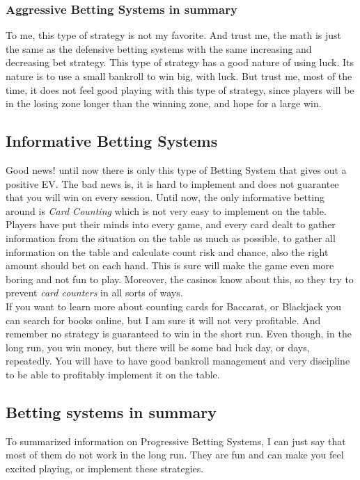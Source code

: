 \documentclass{article}
\begin{document}
\subsubsection{Aggressive Betting Systems in summary}
To me, this type of strategy is not my favorite.  And trust me, the math is just the same as the defensive betting systems with the same increasing and decreasing bet strategy. This type of strategy has a good nature of using luck.  Its nature is to use a small bankroll to win big, with luck.  But trust me, most of the time, it does not feel good playing with this type of strategy, since players will be in the losing zone longer than the winning zone, and hope for a large win.

\subsection{Informative Betting Systems}
Good news! until now there is only this type of Betting System that gives out a positive EV.  The bad news is, it is hard to implement and does not guarantee that you will win on every session.  Until now, the only informative betting around is \emph{Card Counting} which is not very easy to implement on the table.  Players have put their minds into every game, and every card dealt to gather information from the situation on the table as much as possible, to gather all information on the table and calculate count risk and chance, also the right amount should bet on each hand.  This is sure will make the game even more boring and not fun to play.  Moreover, the casinos know about this, so they try to prevent \emph{card counters} in all sorts of ways.\\

If you want to learn more about counting cards for Baccarat, or Blackjack you can search for books online, but I am sure it will not very profitable.  And remember no strategy is guaranteed to win in the short run.  Even though, in the long run, you win money, but there will be some bad luck day, or days, repeatedly.  You will have to have good bankroll management and very discipline to be able to profitably implement it on the table.\\

\subsection{Betting systems in summary}

To summarized information on Progressive Betting Systems, I can just say that most of them do not work in the long run.  They are fun and can make you feel excited playing, or implement these strategies.    \\
\end{document}
